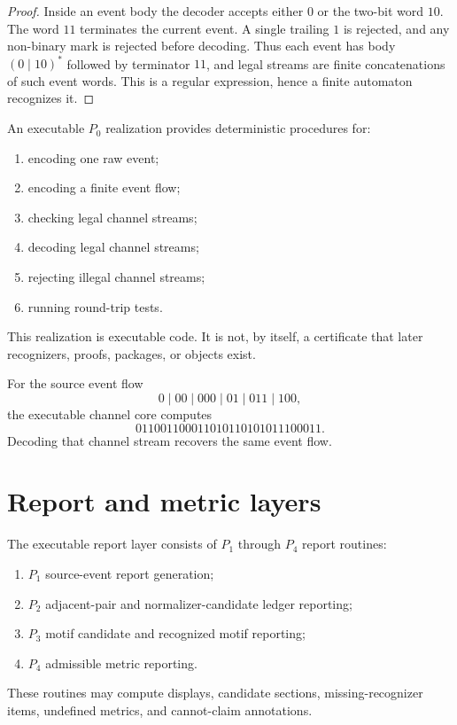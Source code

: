 \begin{proof}
Inside an event body the decoder accepts either $0$ or the two-bit word $10$. The word $11$ terminates the current event. A single trailing $1$ is rejected, and any non-binary mark is rejected before decoding. Thus each event has body $(0\mid 10)^*$ followed by terminator $11$, and legal streams are finite concatenations of such event words. This is a regular expression, hence a finite automaton recognizes it.
\end{proof}

\begin{definition}
\label{def:programmatic-p0-realization}
An executable $P_0$ realization provides deterministic procedures for:
\begin{enumerate}
\item encoding one raw event;
\item encoding a finite event flow;
\item checking legal channel streams;
\item decoding legal channel streams;
\item rejecting illegal channel streams;
\item running round-trip tests.
\end{enumerate}
This realization is executable code. It is not, by itself, a certificate that later recognizers, proofs, packages, or objects exist.
\end{definition}

\begin{example}
\label{ex:programmatic-channel-core-trace}
For the source event flow
$$
  0\mid 00\mid 000\mid 01\mid 011\mid 100,
$$
the executable channel core computes
$$
  011001100011010110101011100011.
$$
Decoding that channel stream recovers the same event flow.
\end{example}

\section{Report and metric layers}
\label{sec:programmatic-report-metric-layers}

\begin{definition}
\label{def:programmatic-executable-report-layer}
The executable report layer consists of $P_1$ through $P_4$ report routines:
\begin{enumerate}
\item $P_1$ source-event report generation;
\item $P_2$ adjacent-pair and normalizer-candidate ledger reporting;
\item $P_3$ motif candidate and recognized motif reporting;
\item $P_4$ admissible metric reporting.
\end{enumerate}
These routines may compute displays, candidate sections, missing-recognizer items, undefined metrics, and cannot-claim annotations.
\end{definition}

